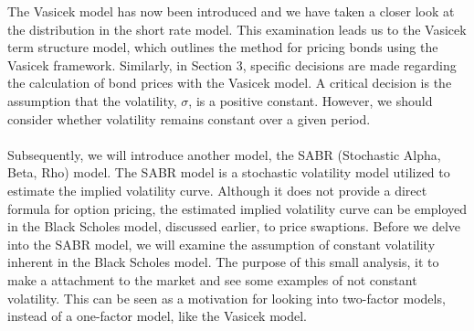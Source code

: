 \noindent
\noindent
The Vasicek model has now been introduced and we have taken a closer look at the distribution in the short rate model. 
This examination leads us to the Vasicek term structure model, which outlines the method for pricing bonds using the 
Vasicek framework. Similarly, in Section 3, specific decisions are made regarding the calculation of bond prices with 
the Vasicek model. A critical decision is the assumption that the volatility, 
$\sigma$, is a positive constant. However, we should consider whether volatility remains constant over a given period.
\\\\
Subsequently, we will introduce another model, the SABR (Stochastic Alpha, Beta, Rho) model. The SABR model is a stochastic volatility model 
utilized to estimate the implied volatility curve. Although it does not provide a direct formula for option pricing, 
the estimated implied volatility curve can be employed in the Black Scholes model, discussed earlier, to price swaptions. 
Before we delve into the SABR model, we will examine the assumption of constant volatility inherent in the Black Scholes model.
The purpose of this small analysis, it to make a attachment to the
market and see some examples of not constant volatility. This can 
be seen as a motivation for looking into two-factor models, 
instead of a one-factor model, like the Vasicek model. 
